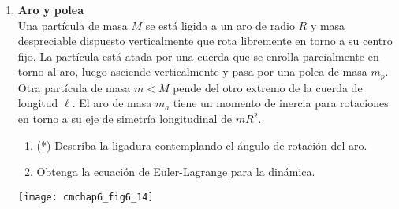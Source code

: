 \documentclass[11pt, spanish, a4paper, twoside]{article}
\begin{document}
\begin{enumerate}
\item 
\begin{minipage}[t][5cm]{0.75\textwidth}
\textbf{Aro y polea}\\
	Una partícula de masa \(M\) se está ligida a un aro de radio \(R\) y masa despreciable dispuesto verticalmente que rota libremente en torno a su centro fijo.
	La partícula está atada por una cuerda que se enrolla parcialmente en torno al aro, luego asciende verticalmente y pasa por una polea de masa \(m_p\).
	Otra partícula de masa \(m < M\) pende del otro extremo de la cuerda de longitud \(\ell\).
	El aro de masa \(m_a\) tiene un momento de inercia para rotaciones en torno a su eje de simetría longitudinal de \(m R^2\).
	\begin{enumerate}
		\item (*) Describa la ligadura contemplando el ángulo de rotación del aro.
		\item Obtenga la ecuación de Euler-Lagrange para la dinámica.
\end{enumerate}
\end{minipage}
\begin{minipage}[c][0cm][t]{0.2\textwidth}
	\texttt{[image: cmchap6\_fig6\_14]}
\end{minipage}



\end{enumerate}
\end{document}
